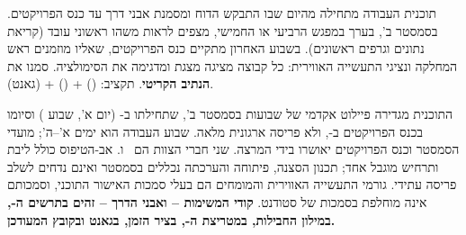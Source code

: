 \begin{pcguide}
תוכנית העבודה מתחילה מהיום שבו התבקש הדוח ומסמנת אבני דרך עד כנס הפרויקטים. בסמסטר ב', בערך במפגש הרביעי או החמישי,
מצפים לראות משהו ראשוני עובד (קריאת נתונים וגרפים ראשונים). בשבוע האחרון מתקיים כנס הפרויקטים, שאליו מוזמנים
ראש המחלקה ונציגי התעשייה האווירית: כל קבוצה מציגה מצגת ומדגימה את הסימולציה. סמנו את \textbf{הנתיב הקריטי}.
תקציב:  () +  () +  (גאנט).
\end{pcguide}
התוכנית מגדירה פיילוט אקדמי של  שבועות בסמסטר ב', שתחילתו ב- (יום א', שבוע ) וסיומו בכנס הפרויקטים
ב-, ולא פריסה ארגונית מלאה. שבוע העבודה הוא ימים א'--ה'; מועדי הסמסטר וכנס הפרויקטים יאושרו בידי
המרצה. שני חברי הצוות הם \StudentTwo\ ו\StudentOne. אב-הטיפוס כולל ליבת  ותרחיש  מוגבל אחד; תכנון הסצנה, פיתוחה והערכתה נכללים
בסמסטר ואינם נדחים לשלב פריסה עתידי. גורמי התעשייה האווירית והמומחים הם בעלי סמכות האישור התוכני, וסמכותם אינה מוחלפת בסמכות של
סטודנט. \textbf{קודי המשימות -- ואבני הדרך -- זהים בתרשים ה-, במילון החבילות, במטריצת ה-,
בציר הזמן, בגאנט ובקובץ  המעודכן.}

